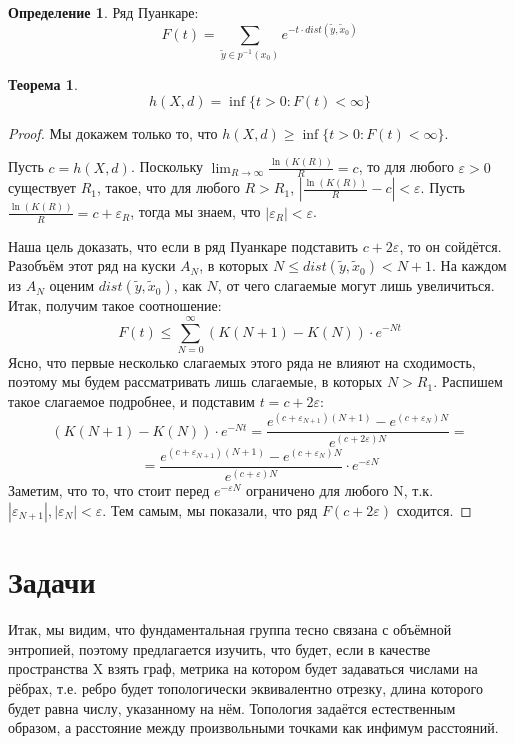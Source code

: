 \documentclass[11pt]{article}
\theoremstyle{definition}
\newtheorem{defin}{Определение}%
\theoremstyle{plain}
\theoremstyle{plain}
\newtheorem{theorem}{Теорема}
\def\leq{\leqslant}
\def\geq{\geqslant}
\def\wt#1{\widetilde{#1}}
\def\eps{\varepsilon}
\begin{document}
\begin{defin}
Ряд Пуанкаре:
$$
  F(t) = \sum_{\wt{y} \in p^{-1}(x_0)} e^{-t \cdot dist(\wt{y}, \wt{x}_0)}
$$
\end{defin}

\begin{theorem}\label{t_puank}
$$
h(X,d) = \inf \{t>0: F(t) < \infty\}
$$
\end{theorem}

\begin{proof} Мы докажем только то, что $h(X,d) \geq \inf \{t>0: F(t) < \infty\}$.

Пусть $c = h(X, d)$. Поскольку $\lim_{R \rightarrow \infty} \frac{\ln (K(R))} {R} = c$, то для любого $\eps > 0$ 
существует $R_1$, такое, что для любого $R > R_1$, $\left|\frac{\ln (K(R))} {R} - c\right| < \eps$.
Пусть $\frac{\ln (K(R))} {R} = c + \eps_R$, тогда мы знаем, что $|\eps_R| < \eps$.

Наша цель доказать, что если в ряд Пуанкаре подставить $c + 2\eps$, то он сойдётся.
Разобъём этот ряд на куски $A_N$, в которых $N \leq dist(\wt{y}, \wt{x}_0) < N+1$. На каждом из $A_N$ оценим $dist(\wt{y}, \wt{x}_0)$, как $N$, 
от чего слагаемые могут лишь увеличиться. Итак, получим такое соотношение:
$$
F(t) \leq \sum_{N=0}^{\infty} (K(N+1)-K(N))\cdot e^{-Nt}
$$
Ясно, что первые несколько слагаемых этого ряда не влияют на сходимость, поэтому мы будем рассматривать лишь слагаемые, в которых $N > R_1$.
Распишем такое слагаемое подробнее, и подставим $t = c + 2\eps$:
$$
(K(N+1)-K(N))\cdot e^{-Nt} = \frac{e^{(c + \eps_{N+1})(N+1)} - e^{(c + \eps_{N})N}}  {e^{(c+2\eps)N}} = 
$$
$$
= \frac{e^{(c + \eps_{N+1})(N+1)} - e^{(c + \eps_{N})N}}  {e^{(c+\eps)N}} \cdot e^{-\eps N}
$$
Заметим, что то, что стоит перед $e^{-\eps N}$ ограничено для любого N, т.к. $|\eps_{N+1}|, |\eps_{N}| < \eps$. 
Тем самым, мы показали, что ряд $F(c+2\eps)$ сходится.





\end{proof}

\section{Задачи}
Итак, мы видим, что фундаментальная группа тесно связана с объёмной энтропией, поэтому предлагается изучить, что будет, 
если в качестве пространства X взять граф, метрика на котором будет задаваться числами на рёбрах, 
т.е. ребро будет топологически эквивалентно отрезку, 
длина которого будет равна числу, указанному на нём. 
Топология задаётся естественным образом, а расстояние между произвольными точками как инфимум расстояний.
\end{document}
